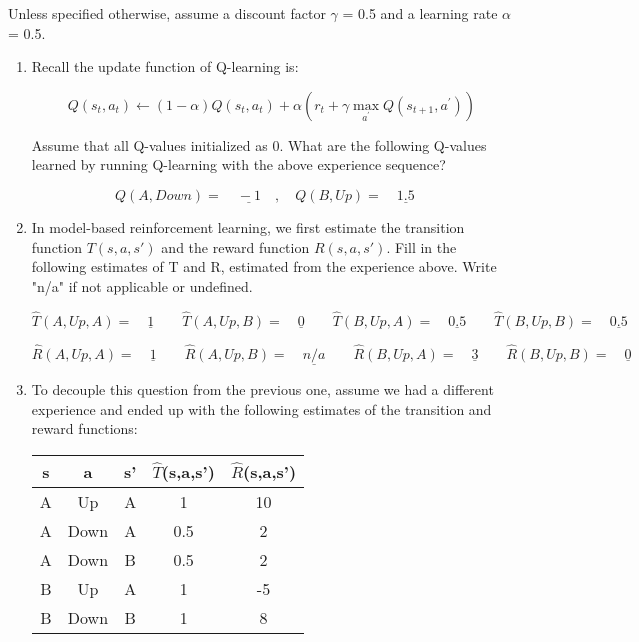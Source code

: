 \documentclass[11pt, answers]{exam}
\begin{document}
Unless specified otherwise, assume a discount factor $\gamma$ = 0.5 and a learning rate $\alpha$ = 0.5.\\
\begin{enumerate}

\item Recall the update function of Q-learning is:

$$Q\left(s_{t}, a_{t}\right) \leftarrow(1-\alpha) Q\left(s_{t}, a_{t}\right)+\alpha\left(r_{t}+\gamma \max _{a^{\prime}} Q\left(s_{t+1}, a^{\prime}\right)\right)$$

Assume that all Q-values initialized as 0. What are the following Q-values learned by running Q-learning with the above experience sequence?

$$Q(A,Down)=\underline{\quad -1 \quad}, \quad Q(B,Up)=\underline{\quad 1.5 \quad}$$

\item In model-based reinforcement learning, we first estimate the transition function $T(s,a,s')$ and the reward function $R(s,a,s')$. Fill in the following estimates of T and R, estimated from the experience above. Write "n/a" if not applicable or undefined.

$$\hat{T}(A,Up,A)=\underline{\quad 1 \quad} \quad \hat{T}(A,Up,B)=\underline{\quad 0 \quad} \quad \hat{T}(B,Up,A)=\underline{\quad 0.5 \quad} \quad \hat{T}(B,Up,B)=\underline{\quad 0.5 \quad}$$

$$\hat{R}(A,Up,A)=\underline{\quad 1 \quad} \quad \hat{R}(A,Up,B)=\underline{\quad n/a \quad} \quad \hat{R}(B,Up,A)=\underline{\quad 3 \quad} \quad \hat{R}(B,Up,B)=\underline{\quad 0 \quad}$$

\newpage

\item To decouple this question from the previous one, assume we had a different experience and ended up with the following estimates of the transition and reward functions:


\begin{table}[h!]
\centering
\begin{tabular}{|c|c|c|c|c|}
\hline
s & a    & s' & $\hat{T}$(s,a,s') & $\hat{R}$(s,a,s') \\ \hline
A & Up   & A  & 1         & 10        \\ \hline
A & Down & A  & 0.5       & 2         \\ \hline
A & Down & B  & 0.5       & 2         \\ \hline
B & Up   & A  & 1         & -5        \\ \hline
B & Down & B  & 1         & 8         \\ \hline
\end{tabular}
\end{table}


\end{enumerate}
\end{document}
